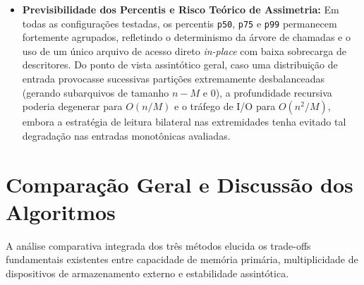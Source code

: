 \documentclass[12pt,a4paper]{article}
\begin{document}
\begin{itemize}
    \item \textbf{Previsibilidade dos Percentis e Risco Teórico de Assimetria:} Em todas as configurações testadas, os percentis \texttt{p50}, \texttt{p75} e \texttt{p99} permanecem fortemente agrupados, refletindo o determinismo da árvore de chamadas e o uso de um único arquivo de acesso direto \textit{in-place} com baixa sobrecarga de descritores. Do ponto de vista assintótico geral, caso uma distribuição de entrada provocasse sucessivas partições extremamente desbalanceadas (gerando subarquivos de tamanho $n - M$ e $0$), a profundidade recursiva poderia degenerar para $O(n / M)$ e o tráfego de I/O para $O(n^2 / M)$, embora a estratégia de leitura bilateral nas extremidades tenha evitado tal degradação nas entradas monotônicas avaliadas.
\end{itemize}

\section{Comparação Geral e Discussão dos Algoritmos}
\label{sec:comparacao}

A análise comparativa integrada dos três métodos elucida os trade-offs fundamentais existentes entre capacidade de memória primária, multiplicidade de dispositivos de armazenamento externo e estabilidade assintótica.
\end{document}
